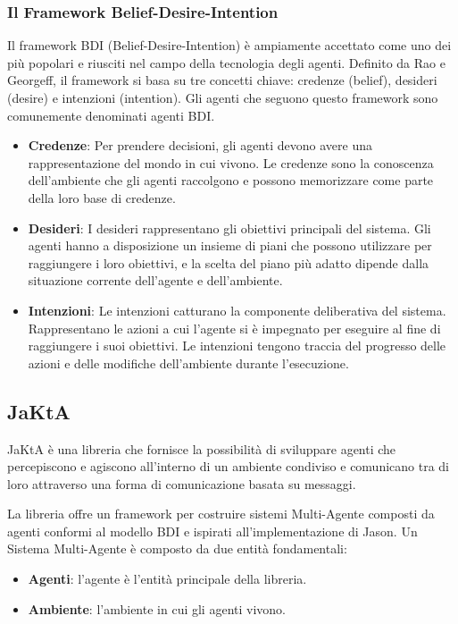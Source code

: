 \subsubsection{Il Framework Belief-Desire-Intention}
Il framework BDI (Belief-Desire-Intention) è ampiamente accettato come uno dei più popolari e riusciti nel campo della tecnologia degli agenti. Definito da Rao e Georgeff, il framework si basa su tre concetti chiave: credenze (belief), desideri (desire) e intenzioni (intention). Gli agenti che seguono questo framework sono comunemente denominati agenti BDI.

\begin{itemize}
    \item \textbf{Credenze}: Per prendere decisioni, gli agenti devono avere una rappresentazione del mondo in cui vivono. Le credenze sono la conoscenza dell'ambiente che gli agenti raccolgono e possono memorizzare come parte della loro base di credenze.
    \item \textbf{Desideri}: I desideri rappresentano gli obiettivi principali del sistema. Gli agenti hanno a disposizione un insieme di piani che possono utilizzare per raggiungere i loro obiettivi, e la scelta del piano più adatto dipende dalla situazione corrente dell'agente e dell'ambiente.
    \item \textbf{Intenzioni}: Le intenzioni catturano la componente deliberativa del sistema. Rappresentano le azioni a cui l'agente si è impegnato per eseguire al fine di raggiungere i suoi obiettivi. Le intenzioni tengono traccia del progresso delle azioni e delle modifiche dell'ambiente durante l'esecuzione.
\end{itemize}

\subsection{JaKtA}
JaKtA è una libreria che fornisce la possibilità di sviluppare agenti che percepiscono e agiscono all'interno di un ambiente condiviso e comunicano tra di loro attraverso una forma di comunicazione basata su messaggi.

La libreria offre un framework per costruire sistemi Multi-Agente composti da agenti conformi al modello BDI e ispirati all'implementazione di Jason. Un Sistema Multi-Agente è composto da due entità fondamentali:

\begin{itemize}
    \item \textbf{Agenti}: l'agente è l'entità principale della libreria.
    \item \textbf{Ambiente}: l'ambiente in cui gli agenti vivono.
\end{itemize}

